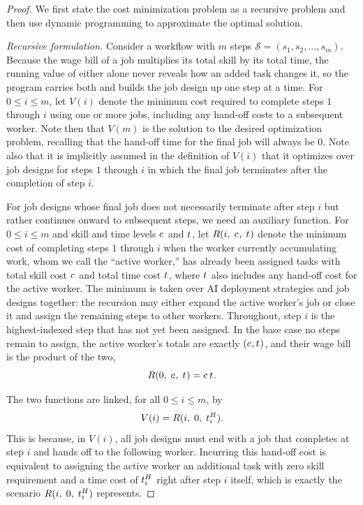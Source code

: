\begin{proof}
We first state the cost minimization problem as a recursive problem and then use dynamic programming to approximate the optimal solution.

\emph{Recursive formulation.}
Consider a workflow with $m$ steps $\mathcal{S} = (s_1, s_2, \dotsc, s_m)$.
Because the wage bill of a job multiplies its total skill by its total time, the running value of either alone never reveals how an added task changes it, so the program carries both and builds the job design up one step at a time.
For $0 \leq i \leq m$, let $V(i)$ denote the minimum cost required to complete steps $1$ through $i$ using one or more jobs, including any hand-off costs to a subsequent worker.
Note then that $V(m)$ is the solution to the desired optimization problem, recalling that the hand-off time for the final job will always be $0$.
Note also that it is implicitly assumed in the definition of $V(i)$ that it optimizes over job designs for steps $1$ through $i$ in which the final job terminates after the completion of step $i$.

For job designs whose final job does not necessarily terminate after step $i$ but rather continues onward to subsequent steps, we need an auxiliary function.
For $0 \leq i \leq m$ and skill and time levels $c_{}$ and $t_{}$, let $R(i,\; c_{},\; t_{})$ denote the minimum cost of completing steps $1$ through $i$ when the worker currently accumulating work, whom we call the ``active worker,'' has already been assigned tasks with total skill cost $c_{}$ and total time cost $t_{}$, where $t_{}$ also includes any hand-off cost for the active worker.
The minimum is taken over AI deployment strategies and job designs together: the recursion may either expand the active worker's job or close it and assign the remaining steps to other workers.
Throughout, step $i$ is the highest-indexed step that has not yet been assigned.
In the base case no steps remain to assign, the active worker's totals are exactly $(c_{}, t_{})$, and their wage bill is the product of the two,
\[ R(0,\; c_{},\; t_{}) = c_{}\,t_{}. \]

The two functions are linked, for all $0 \leq i \leq m$, by
\[ V(i) = R(i,\; 0,\; t^{H}_{i}). \]
This is because, in $V(i)$, all job designs must end with a job that completes at step $i$ and hands off to the following worker.
Incurring this hand-off cost is equivalent to assigning the active worker an additional task with zero skill requirement and a time cost of $t^{H}_{i}$ right after step $i$ itself, which is exactly the scenario $R(i,\; 0,\; t^{H}_{i})$ represents.


\end{proof}

